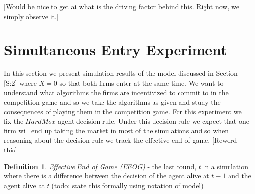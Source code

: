 \documentclass{article}
\theoremstyle{definition}
\newtheorem{definition}{Definition}[section]
\begin{document}
[Would be nice to get at what is the driving factor behind this. Right now, we simply observe it.]

\section{Simultaneous Entry Experiment}
\label{S:6}

In this section we present simulation results of the model discussed in Section \ref{S:2} where $X = 0$ so that both firms enter at the same time. We want to understand what algorithms the firms are incentivized to commit to in the competition game and so we take the algorithms as given and study the consequences of playing them in the competition game. For this experiment we fix the $HardMax$ agent decision rule. Under this decision rule we expect that one firm will end up taking the market in most of the simulations and so when reasoning about the decision rule we track the effective end of game.
[Reword this]

\begin{definition}
\textit{Effective End of Game (EEOG)} - the last round, $t$ in a simulation where there is a difference between the decision of the agent alive at $t-1$ and the agent alive at $t$ (todo: state this formally using notation of model)
\end{definition}
\end{document}
